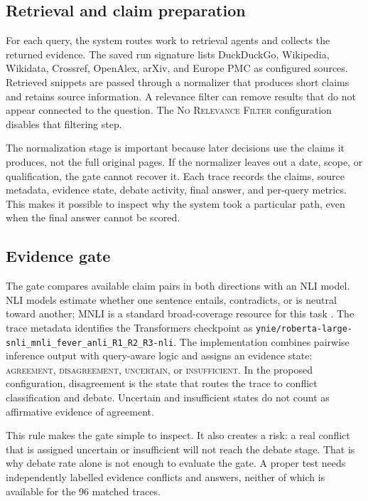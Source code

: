 \documentclass[conference]{IEEEtran}
\begin{document}
\subsection{Retrieval and claim preparation}
For each query, the system routes work to retrieval agents and collects the returned evidence. The saved run signature lists DuckDuckGo, Wikipedia, Wikidata, Crossref, OpenAlex, arXiv, and Europe PMC as configured sources. Retrieved snippets are passed through a normalizer that produces short claims and retains source information. A relevance filter can remove results that do not appear connected to the question. The \textsc{No Relevance Filter} configuration disables that filtering step.

The normalization stage is important because later decisions use the claims it produces, not the full original pages. If the normalizer leaves out a date, scope, or qualification, the gate cannot recover it. Each trace records the claims, source metadata, evidence state, debate activity, final answer, and per-query metrics. This makes it possible to inspect why the system took a particular path, even when the final answer cannot be scored.

\subsection{Evidence gate}
The gate compares available claim pairs in both directions with an NLI model. NLI models estimate whether one sentence entails, contradicts, or is neutral toward another; MNLI is a standard broad-coverage resource for this task \cite{williams2018mnli}. The trace metadata identifies the Transformers checkpoint as \texttt{ynie/roberta-large-snli\_mnli\_fever\_anli\_R1\_R2\_R3-nli}. The implementation combines pairwise inference output with query-aware logic and assigns an evidence state: \textsc{agreement}, \textsc{disagreement}, \textsc{uncertain}, or \textsc{insufficient}. In the proposed configuration, disagreement is the state that routes the trace to conflict classification and debate. Uncertain and insufficient states do not count as affirmative evidence of agreement.

This rule makes the gate simple to inspect. It also creates a risk: a real conflict that is assigned uncertain or insufficient will not reach the debate stage. That is why debate rate alone is not enough to evaluate the gate. A proper test needs independently labelled evidence conflicts and answers, neither of which is available for the 96 matched traces.
\end{document}
